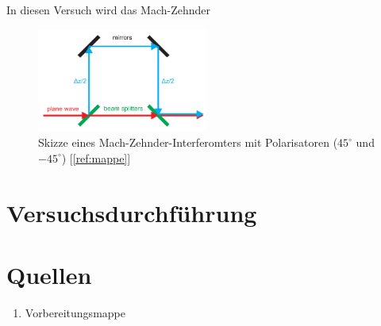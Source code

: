 \documentclass[a4paper,ngerman]{scrartcl}
\begin{document}
In diesen Versuch wird das Mach-Zehnder 

\begin{figure}
\includegraphics[width=0.5\textwidth]{interferomter-einfach.png}
\caption{Skizze eines Mach-Zehnder-Interferomters mit Polarisatoren ($45^{\circ}$ und $-45^{\circ}$) [\ref{ref:mappe}]}
\label{fig:mach-zehnder}
\end{figure}



\section{Versuchsdurchführung}
\label{sec:versuchsdurchfuhrung}


\clearpage
\section{Quellen}
\begin{enumerate}
\item Vorbereitungsmappe \label{ref:mappe}
\end{enumerate}
\end{document}
